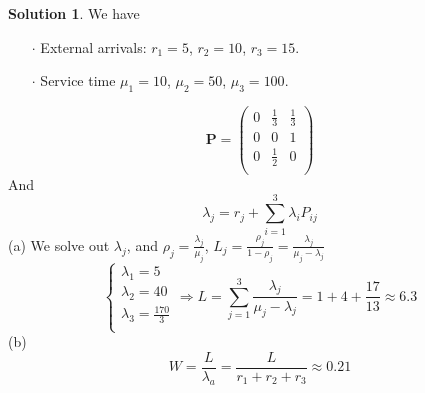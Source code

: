 \documentclass[a4paper, 10pt]{article}
\theoremstyle{definition}
\theoremstyle{hSol}
\newtheorem*{solution}{Solution}
\begin{document}
\begin{solution} We have
\begin{itemize}
  \item[$\cdot$] External arrivals: $r_1= 5$, $r_2=10$, $r_3=15$.
  \item[$\cdot$] Service time $\mu_1 = 10$, $\mu_2=50$, $\mu_3=100$.
\end{itemize}
\begin{equation}
  \bm{P} = \begin{pmatrix}
    0 & \frac{1}{3} & \frac{1}{3} \\
    0 & 0 & 1 \\
    0 & \frac{1}{2} & 0 \\
  \end{pmatrix}
\end{equation}
And
\begin{equation}
  \lambda_j = r_j + \sum_{i=1}^3 \lambda_i P_{ij}
\end{equation}
(a) We solve out $\lambda_j$, and $\rho_j = \frac{\lambda_j}{\mu_j}$, $L_j=\frac{\rho_j}{1-\rho_j}=\frac{\lambda_j}{\mu_j - \lambda_j}$
\begin{equation}
  \begin{cases}
  \lambda_1 = 5 \\
  \lambda_2 = 40 \\
  \lambda_3 = \frac{170}{3}\\
  \end{cases}
  \Rightarrow 
  L = \sum_{j=1}^3\frac{\lambda_j}{\mu_j - \lambda_j} = 1+4+ \frac{17}{13}\approx 6.3
\end{equation}
(b)
\begin{equation}
  W = \frac{L}{\lambda_a} = \frac{L}{r_1+r_2+r_3} \approx 0.21
\end{equation}

\end{solution}
\end{document}
